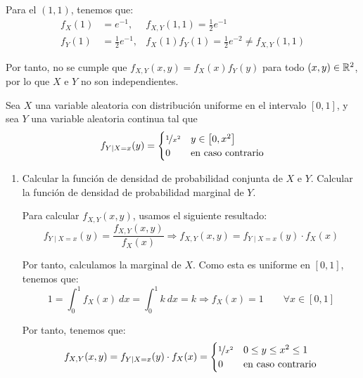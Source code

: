 \begin{ejercicio}
    Para el $(1,1)$, tenemos que:
    \begin{align*}
        f_X(1) &= e^{-1}, & f_{X,Y}(1,1)=\frac{1}{2}e^{-1} \\
        f_Y(1) &= \frac{1}{2}e^{-1} , & f_X(1)f_Y(1)=\frac{1}{2}e^{-2}\neq f_{X,Y}(1,1)
    \end{align*}

    Por tanto, no se cumple que $f_{X,Y}(x,y)=f_X(x)f_Y(y)$ para todo $(x,y)\in\mathbb{R}^2$, por lo que $X$ e $Y$ no son independientes.
\end{ejercicio}

\begin{ejercicio}
    Sea $X$ una variable aleatoria con distribución uniforme en el intervalo $[0,1]$, y sea $Y$ una variable aleatoria continua tal que
    \begin{equation*}
        f_{Y\mid X=x}(y) = \begin{cases}
            \nicefrac{1}{x^2} & y \in \left[0, x^2\right]\\
            0 & \text{en caso contrario}
        \end{cases}
    \end{equation*}
    \begin{enumerate}
        \item\label{ej:4.8.a} Calcular la función de densidad de probabilidad conjunta de $X$ e $Y$. Calcular la función de densidad de probabilidad marginal de $Y$.
        
        Para calcular $f_{X,Y}(x,y)$, usamos el siguiente resultado:
        \begin{equation*}
            f_{Y\mid X=x}(y) = \dfrac{f_{X,Y}(x,y)}{f_X(x)}
            \Longrightarrow
            f_{X,Y}(x,y) = f_{Y\mid X=x}(y)\cdot f_X(x)
        \end{equation*}

        Por tanto, calculamos la marginal de $X$. Como esta es uniforme en $[0,1]$, tenemos que:
        \begin{equation*}
            1=\int_{0}^{1} f_X(x) \ dx = \int_{0}^{1} k \ dx = k
            \Longrightarrow f_X(x) = 1\qquad \forall x\in[0,1]
        \end{equation*}

        Por tanto, tenemos que:
        \begin{equation*}
            f_{X,Y}(x,y) = f_{Y\mid X=x}(y)\cdot f_X(x) = \begin{cases}
                \nicefrac{1}{x^2} & 0\leq y\leq x^2\leq 1\\
                0 & \text{en caso contrario}
            \end{cases}
        \end{equation*}


\end{enumerate}
\end{ejercicio}
